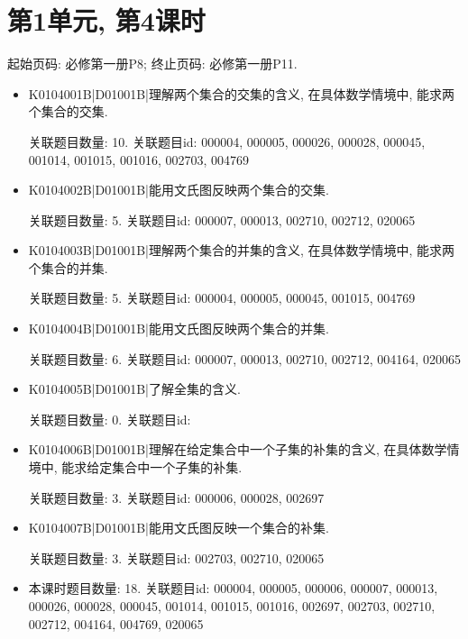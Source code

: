 \section*{第1单元, 第4课时}
起始页码: 必修第一册P8; 终止页码: 必修第一册P11.
\begin{itemize}
\item K0104001B|D01001B|理解两个集合的交集的含义, 在具体数学情境中, 能求两个集合的交集.

关联题目数量: 10. 关联题目id: 000004, 000005, 000026, 000028, 000045, 001014, 001015, 001016, 002703, 004769

\item K0104002B|D01001B|能用文氏图反映两个集合的交集.

关联题目数量: 5. 关联题目id: 000007, 000013, 002710, 002712, 020065

\item K0104003B|D01001B|理解两个集合的并集的含义, 在具体数学情境中, 能求两个集合的并集.

关联题目数量: 5. 关联题目id: 000004, 000005, 000045, 001015, 004769

\item K0104004B|D01001B|能用文氏图反映两个集合的并集.

关联题目数量: 6. 关联题目id: 000007, 000013, 002710, 002712, 004164, 020065

\item K0104005B|D01001B|了解全集的含义.

关联题目数量: 0. 关联题目id: 

\item K0104006B|D01001B|理解在给定集合中一个子集的补集的含义, 在具体数学情境中, 能求给定集合中一个子集的补集.

关联题目数量: 3. 关联题目id: 000006, 000028, 002697

\item K0104007B|D01001B|能用文氏图反映一个集合的补集.

关联题目数量: 3. 关联题目id: 002703, 002710, 020065

\item 本课时题目数量: 18. 关联题目id: 000004, 000005, 000006, 000007, 000013, 000026, 000028, 000045, 001014, 001015, 001016, 002697, 002703, 002710, 002712, 004164, 004769, 020065

\end{itemize}

